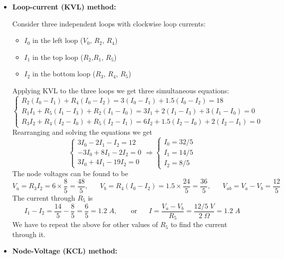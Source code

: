 \documentclass{article}
\begin{document}
\begin{itemize}
\item {\bf Loop-current (KVL) method:} 

Consider three independent loops with clockwise loop currents:
\begin{itemize}
\item $I_0$ in the left loop ($V_0$, $R_2$, $R_4$) 
\item $I_1$ in the top loop ($R_2$,$R_1$, $R_5$) 
\item $I_2$ in the bottom loop ($R_3$, $R_4$, $R_5$)
\end{itemize}
Applying KVL to the three loops we get three simultaneous equations:
\begin{equation}
  \left\{\begin{array}{l}
  R_2(I_0-I_1)+R_4(I_0-I_2)=3(I_0-I_1)+1.5(I_0-I_2)=18\\
  R_1I_1+R_5(I_1-I_3)+R_2(I_1-I_0)=3I_1+2(I_1-I_3)+3(I_1-I_0)=0\\
  R_3I_2+R_4(I_2-I_0)+R_5(I_2-I_1)=6I_2+1.5(I_2-I_0)+2(I_2-I_1)
  =0\end{array}\right.
\end{equation}
Rearranging and solving the equations we get
\begin{equation}
  \left\{\begin{array}{l}
  3I_0-2I_1-I_2=12\\-3I_0+8I_1-2I_2=0\\3I_0+4I_1-19I_2=0\end{array}\right.
  \Longrightarrow
  \left\{\begin{array}{l}
  I_0=32/5\\I_1=14/5\\I_2=8/5
  \end{array}\right.
\end{equation}
The node voltages can be found to be
\begin{equation}
  V_a=R_3I_2=6\times \frac{8}{5}=\frac{48}{5},\;\;\;\;\;\;
  V_b=R_4(I_0-I_2)=1.5\times \frac{24}{5}=\frac{36}{5},\;\;\;\;\;\;
  V_{ab}=V_a-V_b=\frac{12}{5}
\end{equation}
The current through $R_5$ is
\begin{equation}
  I_1-I_2=\frac{14}{5}-\frac{8}{5}=\frac{6}{5}=1.2\;A,
  \;\;\;\;\;\;\;\mbox{or}\;\;\;\;\;\;
  I=\frac{V_a-V_b}{R_5}=\frac{12/5\;V}{2\;\Omega}=1.2\;A
\end{equation}
We have to repeat the above for other values of $R_5$ to find
the current through it.

\item {\bf Node-Voltage (KCL) method:} 


\end{itemize}
\end{document}
